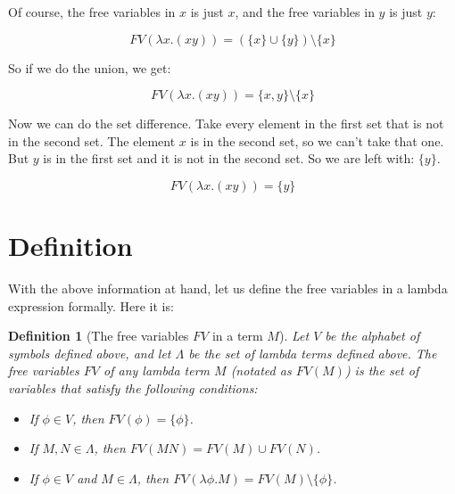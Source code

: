 \documentclass{book}
\numberwithin{equation}{chapter}
\newtheorem{definition}{Definition}
\begin{document}
\noindent
Of course, the free variables in $x$ is just $x$, and the free variables in $y$ is just $y$:

\begin{equation}
FV(\lambda x.(x y)) = (\{ x \} \cup \{ y \}) \setminus \{ x \}
\end{equation}

\noindent
So if we do the union, we get:

\begin{equation}
FV(\lambda x.(x y)) = \{ x, y \} \setminus \{ x \}
\end{equation}

\noindent
Now we can do the set difference. Take every element in the first set that is not in the second set. The element $x$ is in the second set, so we can't take that one. But $y$ is in the first set and it is not in the second set. So we are left with: $\{ y \}$.

\begin{equation}
FV(\lambda x.(x y)) = \{ y \}
\end{equation}


\section{Definition}

With the above information at hand, let us define the free variables in a lambda expression formally. Here it is:

\begin{definition}[The free variables $FV$ in a term $M$]
Let $V$ be the alphabet of symbols defined above, and let $\Lambda$ be the set of lambda terms defined above. The free variables $FV$ of any lambda term $M$ (notated as $FV(M)$) is the set of variables that satisfy the following conditions:

\begin{itemize}

\item{If $\phi \in V$, then $FV(\phi) = \{ \phi \}$.}
\item{If $M, N \in \Lambda$, then $FV(M N) = FV(M) \cup FV(N)$.}
\item{If $\phi \in V$ and $M \in \Lambda$, then $FV(\lambda \phi.M) = FV(M) \setminus \{ \phi \}$.}

\end{itemize}

\end{definition}
\end{document}
